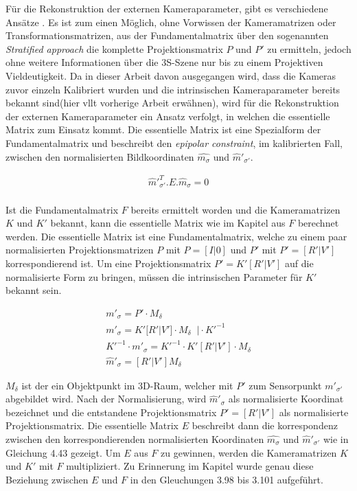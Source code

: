 Für die Rekonstruktion der externen Kameraparameter, gibt es verschiedene Ansätze \cite{HZ}. Es ist zum einen Möglich, ohne Vorwissen der Kameramatrizen oder Transformationsmatrizen, aus der Fundamentalmatrix über den sogenannten \textit{Stratified approach} die komplette Projektionsmatrix $P$ und $P'$ zu ermitteln, jedoch ohne weitere Informationen über die 3S-Szene nur bis zu einem Projektiven Vieldeutigkeit\cite{HZ}. Da in dieser Arbeit davon ausgegangen wird, dass die Kameras zuvor einzeln Kalibriert wurden und die intrinsischen Kameraparameter bereits bekannt sind(hier vllt vorherige Arbeit erwähnen), wird für die Rekonstruktion der externen Kameraparameter ein Ansatz verfolgt, in welchen die essentielle Matrix zum Einsatz kommt. Die essentielle Matrix ist eine Spezialform der Fundamentalmatrix und beschreibt den \textit{epipolar constraint}, im  kalibrierten Fall, zwischen den normalisierten Bildkoordinaten $\hat{m_\sigma}$ und $\hat{m}'_{\sigma'}$\cite{HZ,Elements,ZZGXr,Zhang2014,Ferid}. 


\begin{gather}
\hat{m}'^T_{\sigma'}.E.\hat{m}_\sigma = 0
\end{gather}\\ 

Ist die Fundamentalmatrix $F$ bereits ermittelt worden und die Kameramatrizen $K$ und $K'$ bekannt, kann die essentielle Matrix wie im Kapitel  aus $F$ berechnet werden. Die essentielle Matrix ist eine Fundamentalmatrix, welche zu einem paar normalisierten Projektionsmatrizen $P$ mit $P = [I|0]$ und $P'$ mit $P'= [R'|V']$ korrespondierend ist\cite{HZ,Zhang2014,ZZGXr,Ferid}. Um eine Projektionsmatrix $P'=K'[R'|V']$ auf die normalisierte Form zu bringen, müssen die intrinsischen Parameter für $K'$ bekannt sein. 

\begin{gather}
	m'_{\sigma} = P' \cdot M_\delta\\
	m'_{\sigma} = K'[R'|V'] \cdot M_\delta\;\; | \cdot K'^{-1}\\
	K'^{-1} \cdot m'_{\sigma} = K'^{-1} \cdot K'[R'|V'] \cdot M_\delta\\
	\hat{m}'_{\sigma} = [R'|V'] M_\delta
\end{gather}

$M_\delta$ ist der ein Objektpunkt im 3D-Raum, welcher mit $P'$ zum Sensorpunkt $m'_{\sigma'}$ abgebildet wird. Nach der Normalisierung, wird $\hat{m}'_{\sigma}$ als normalisierte Koordinat bezeichnet und die entstandene Projektionsmatrix $P' = [R'|V']$ als normalisierte Projektionsmatrix\cite{HZ,Ferid}. Die essentielle Matrix $E$ beschreibt dann die korrespondenz zwischen den korrespondierenden normalisierten Koordinaten  $\hat{m_\sigma}$ und $\hat{m}'_{\sigma'}$ wie in Gleichung 4.43 gezeigt. Um $E$ aus $F$ zu gewinnen, werden die Kameramatrizen $K$ und $K'$ mit $F$ multipliziert. Zu Erinnerung im Kapitel  wurde genau diese Beziehung zwischen $E$ und $F$ in den Gleuchungen 3.98 bis 3.101 aufgeführt. 


